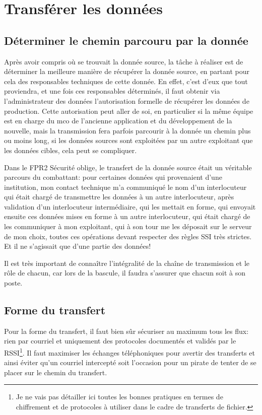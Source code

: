 \documentclass{book}
\begin{document}
\section{Transférer les données}
\subsection{Déterminer le chemin parcouru par la donnée}

Après avoir compris où se trouvait la donnée source, la tâche à réaliser est de déterminer la meilleure manière de récupérer la donnée source, en partant pour cela des responsables techniques de cette donnée. En effet, c'est d'eux que tout proviendra, et une fois ces responsables déterminés, il faut obtenir via l'administrateur des données l'autorisation formelle de récupérer les données de production. Cette autorisation peut aller de soi, en particulier si la même équipe est en charge du \gls{mco} de l'ancienne application et du développement de la nouvelle, mais la transmission fera parfois parcourir à la donnée un chemin plus ou moins long, si les données sources sont exploitées par un autre exploitant que les données cibles, cela peut se compliquer.

\begin{bclogo}[arrondi = 0.1, couleur = blue!10, logo = \bcinfo]{Dans le FPR2}
Sécurité oblige, le transfert de la donnée source était un véritable parcours du combattant: pour certaines données qui provenaient d'une institution, mon contact technique m'a communiqué le nom d'un interlocuteur qui était chargé de transmettre les données à un autre interlocuteur, après validation d'un interlocuteur intermédiaire, qui les mettait en forme, qui envoyait ensuite ces données mises en forme à un autre interlocuteur, qui était chargé de les communiquer à mon exploitant, qui à son tour me les déposait sur le serveur de mon choix, toutes ces opérations devant respecter des règles SSI très strictes. Et il ne s'agissait que d'une partie des données!
\end{bclogo}

Il est très important de connaître l'intégralité de la chaîne de transmission et le rôle de chacun, car lors de la bascule, il faudra s'assurer que chacun soit à son poste.

\subsection{Forme du transfert}

Pour la forme du transfert, il faut bien sûr sécuriser au maximum tous les flux: rien par courriel et uniquement des protocoles documentés et validés par le RSSI\footnote{Je ne vais pas détailler ici toutes les bonnes pratiques en termes de chiffrement et de protocoles à utiliser dans le cadre de transferts de fichier.}. Il faut maximiser les échanges téléphoniques pour avertir des transferts et ainsi éviter qu'un courriel intercepté soit l'occasion pour un pirate de tenter de se placer sur le chemin du transfert. 
\end{document}
